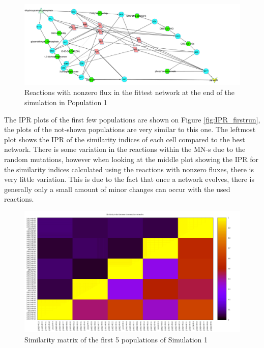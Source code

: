 \documentclass[10pt,a4paper]{article}
\begin{document}
\begin{figure}[htpb]
	\centering
	\includegraphics[width=1\linewidth]{trunk_glyc_final_job1.pdf}
	\caption{Reactions with nonzero flux in the fittest network at the end of the simulation in Population 1}
	\label{fig:trunk_glyc_final_job1}
\end{figure}



The IPR plots of the first few populations are shown on Figure \ref{fig:IPR_firstrun}, the plots of the not-shown populations are very similar to this one. The leftmost plot shows the IPR of the similarity indices of each cell compared to the best network. There is some variation in the reactions within the MN-s due to the random mutations, however when looking at the middle plot showing the IPR for the similarity indices calculated using the reactions with nonzero fluxes, there is very little variation. This is due to the fact that once a network evolves, there is generally only a small amount of minor changes can occur with the used reactions. 

\begin{figure}[htpb]
	\centering
	\includegraphics[width=1\linewidth]{simmatrix_firstjob.png}
	\caption{Similarity matrix of the first 5 populations of Simulation 1}
	\label{fig:simmatrix_firstjob}
\end{figure}
\end{document}
